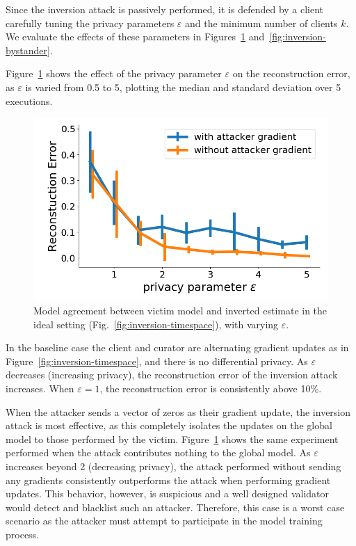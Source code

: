 Since the inversion attack is passively performed, it is defended by a
client carefully tuning the privacy parameters $\varepsilon$ and the
minimum number of clients $k$. We evaluate the effects of these
parameters in Figures~\ref{fig:inversion-ideal}
and~\ref{fig:inversion-bystander}.

Figure~\ref{fig:inversion-ideal} shows the effect of the privacy
parameter $\varepsilon$ on the reconstruction error, as $\varepsilon$
is varied from 0.5 to 5, plotting the median and standard deviation
over 5 executions.

\begin{figure}[t]
	\includegraphics[width=\linewidth]{fig/inversion-ideal}
	\caption{Model agreement between victim model and inverted estimate
	in the ideal setting (Fig.~\ref{fig:inversion-timespace}), with varying $\varepsilon$.}
	\label{fig:inversion-ideal}
\end{figure}

In the baseline case the client and curator are alternating gradient
updates as in Figure~\ref{fig:inversion-timespace}, and there is no
differential privacy. As $\varepsilon$ decreases (increasing privacy),
the reconstruction error of the inversion attack increases. When
$\varepsilon = 1$, the reconstruction error is consistently 
above 10\%.

When the attacker sends a vector of zeros as their gradient update,
the inversion attack is most effective, as this completely isolates
the updates on the global model to those performed by the
victim. Figure~\ref{fig:inversion-ideal} shows the same experiment
performed when the attack contributes nothing to the global model. As
$\varepsilon$ increases beyond 2 (decreasing privacy), the attack
performed without sending any gradients consistently outperforms the
attack when performing gradient updates. This behavior, however, is
suspicious and a well designed validator would detect and blacklist
such an attacker. Therefore, this case is a worst case scenario as the
attacker must attempt to participate in the model training process.

